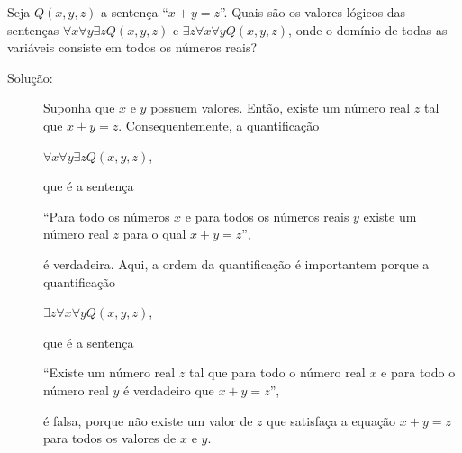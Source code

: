 \begin{exmp}
\label{exem152}
Seja $Q(x,y,z)$ a sentença ``$x+y=z$''. Quais são os valores lógicos das
sentenças $\forall x\forall y\exists zQ(x,y,z)$ e $\exists z\forall x\forall
yQ(x,y,z)$, onde o domínio de todas as variáveis consiste em todos os números
reais?
\begin{description}
\item[Solução:]Suponha que $x$ e $y$ possuem valores. Então, existe um número
real $z$ tal que $x+y=z$. Consequentemente, a quantificação
\begin{center}
$\forall x\forall y\exists zQ(x,y,z)$,
\end{center}
que é a sentença
\begin{center}
``Para todo os números $x$ e para todos os números reais $y$ existe um número
real $z$ para o qual $x+y=z$'',
\end{center}
é verdadeira. Aqui, a ordem da quantificação é importantem porque a
quantificação
\begin{center}
$\exists z\forall x\forall yQ(x,y,z)$,
\end{center}
que é a sentença
\begin{center}
``Existe um número real $z$ tal que para todo o número real $x$ e para todo o
número real $y$ é verdadeiro que $x+y=z$'',
\end{center}
é falsa, porque não existe um valor de $z$ que satisfaça a equação $x+y=z$ para
todos os valores de $x$ e $y$.
\end{description}
\end{exmp}



